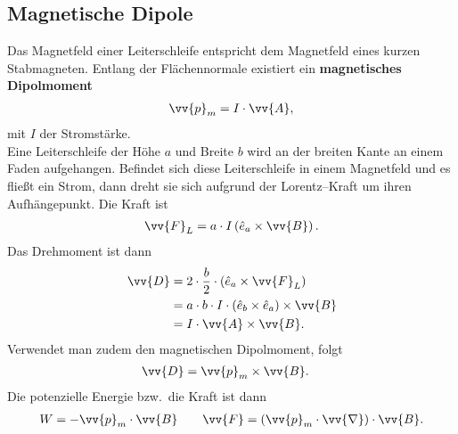 \documentclass[a4paper,12pt]{article}
\begin{document}
\subsection{Magnetische Dipole}
Das Magnetfeld einer Leiterschleife entspricht dem Magnetfeld eines kurzen Stabmagneten. Entlang der Flächennormale existiert ein \textbf{magnetisches Dipolmoment} 
\begin{align*} 
        \vv{p}_m=I\cdot \vv{A}
,\end{align*} 
mit $I$ der Stromstärke.\\\indent
Eine Leiterschleife der Höhe $a$ und Breite $b$ wird an der breiten Kante an einem Faden aufgehangen. Befindet sich diese Leiterschleife in einem Magnetfeld und es fließt ein Strom, dann dreht sie sich aufgrund der Lorentz--Kraft um ihren Aufhängepunkt. Die Kraft ist
\begin{align*} 
        \vv{F}_L=a\cdot I\left(\hat{e}_a\times \vv{B}\right)
.\end{align*} 
Das Drehmoment ist dann
\begin{align*} 
        \vv{D}&=2\cdot \dfrac{b}{2}\cdot \left(\hat{e}_a\times \vv{F}_L\right)\\
              &=a\cdot b \cdot I\cdot \left(\hat{e}_b\times \hat{e}_a\right)\times \vv{B}\\
              &=I\cdot \vv{A}\times \vv{B}
.\end{align*} 
Verwendet man zudem den magnetischen Dipolmoment, folgt
\begin{align*} 
        \vv{D}&=\vv{p}_m\times \vv{B}
.\end{align*} 
Die potenzielle Energie bzw.\ die Kraft ist dann
\begin{align*} 
        W=-\vv{p}_m\cdot \vv{B}\qquad \vv{F}=\left(\vv{p}_m\cdot \vv{\nabla }\right)\cdot \vv{B}
.\end{align*} 
\end{document}
